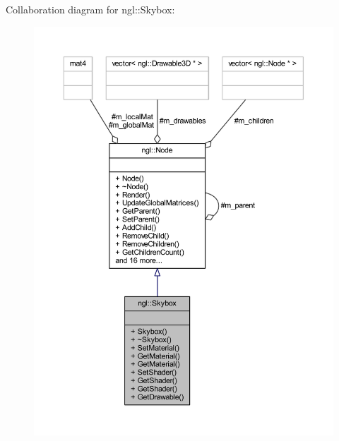 Collaboration diagram for ngl\+:\+:Skybox\+:
\nopagebreak
\begin{figure}[H]
\begin{center}
\leavevmode
\includegraphics[width=350pt]{classngl_1_1_skybox__coll__graph}
\end{center}
\end{figure}
